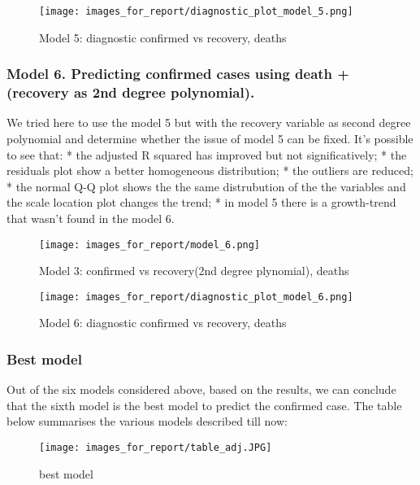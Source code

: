 \documentclass[11pt]{article}
\makeatletter
\def\maxwidth{\ifdim\Gin@nat@width>\linewidth\linewidth
    \else\Gin@nat@width\fi}
\let\Oldincludegraphics\includegraphics
\renewcommand{\includegraphics}[1]{\Oldincludegraphics[width=.8\maxwidth]{#1}}
\makeatother
\begin{document}
\begin{figure}
\centering
\texttt{[image: images\_for\_report/diagnostic\_plot\_model\_5.png]}
\caption{Model 5: diagnostic confirmed vs recovery, deaths}
\end{figure}

\hypertarget{model-6.-predicting-confirmed-cases-using-death-recovery-as-2nd-degree-polynomial.}{%
\subsubsection{Model 6. Predicting confirmed cases using death +
(recovery as 2nd degree
polynomial).}\label{model-6.-predicting-confirmed-cases-using-death-recovery-as-2nd-degree-polynomial.}}

We tried here to use the model 5 but with the recovery variable as
second degree polynomial and determine whether the issue of model 5 can
be fixed. It's possible to see that: * the adjusted R squared has
improved but not significatively; * the residuals plot show a better
homogeneous distribution; * the outliers are reduced; * the normal Q-Q
plot shows the the same distrubution of the the variables and the scale
location plot changes the trend; * in model 5 there is a growth-trend
that wasn't found in the model 6.

\begin{figure}
\centering
\texttt{[image: images\_for\_report/model\_6.png]}
\caption{Model 3: confirmed vs recovery(2nd degree plynomial), deaths}
\end{figure}

\begin{figure}
\centering
\texttt{[image: images\_for\_report/diagnostic\_plot\_model\_6.png]}
\caption{Model 6: diagnostic confirmed vs recovery, deaths}
\end{figure}

\hypertarget{best-model}{%
\subsubsection{Best model}\label{best-model}}

Out of the six models considered above, based on the results, we can
conclude that the sixth model is the best model to predict the confirmed
case. The table below summarises the various models described till now:

\begin{figure}
\centering
\texttt{[image: images\_for\_report/table\_adj.JPG]}
\caption{best model}
\end{figure}
\end{document}
